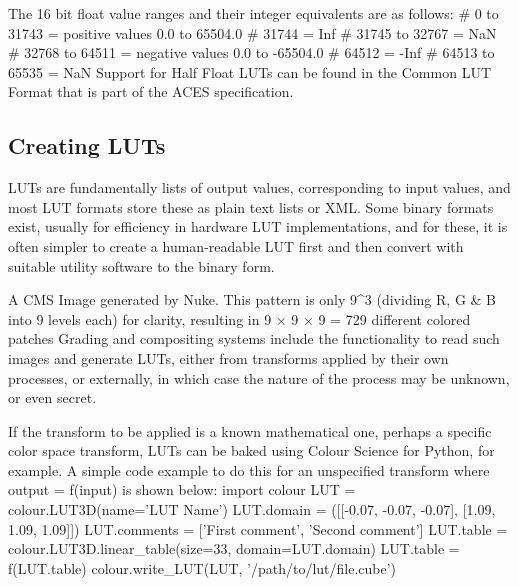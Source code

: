 The 16 bit float value ranges and their integer equivalents are as follows:
        # 0 to 31743 = positive values 0.0 to 65504.0
        # 31744 = Inf
        # 31745 to 32767 = NaN
        # 32768 to 64511 = negative values 0.0 to -65504.0
        # 64512 = -Inf
        # 64513 to 65535 = NaN
Support for Half Float LUTs can be found in the Common LUT Format that is part of the ACES specification.

\subsection{Creating LUTs}
\label{subsec:creating-luts}

LUTs are fundamentally lists of output values, corresponding to input values, and most LUT formats store these as plain text lists or XML. Some binary formats exist, usually for efficiency in hardware LUT implementations, and for these, it is often simpler to create a human-readable LUT first and then convert with suitable utility software to the binary form.

A CMS Image generated by Nuke. This pattern is only 9^3 (dividing R, G & B into 9 levels each)
for clarity, resulting in 9 × 9 × 9 = 729 different colored patches
Grading and compositing systems include the functionality to read such images and generate LUTs, either from transforms applied by their own processes, or externally, in which case the nature of the process may be unknown, or even secret.

If the transform to be applied is a known mathematical one, perhaps a specific color space transform, LUTs can be baked using Colour Science for Python, for example. A simple code example to do this for an unspecified transform where output = f(input) is shown below:
import colour
LUT = colour.LUT3D(name='LUT Name')
LUT.domain = ([[-0.07, -0.07, -0.07], [1.09, 1.09, 1.09]])
LUT.comments = ['First comment', 'Second comment']
LUT.table = colour.LUT3D.linear_table(size=33, domain=LUT.domain)
LUT.table = f(LUT.table)
colour.write_LUT(LUT, '/path/to/lut/file.cube')

